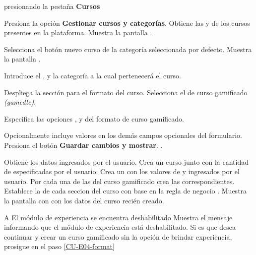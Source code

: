 \begin{UCtrayectoria}%
   presionando la pestaña {\bf Cursos}

  \Actor Presiona la opción {\bf Gestionar cursos y categorías}.
  \Sistema Obtiene las  y
            de los cursos presentes en la plataforma.
  \Sistema Muestra la pantalla .

  \Actor Selecciona el botón nuevo curso de la categoría seleccionada por defecto.
  \Sistema Muestra la pantalla .

  \Actor Introduce el ,  y
         la categoría a la cual pertenecerá el curso.

  \Actor Despliega la sección para el formato del curso.
  \Actor Selecciona el  de curso gamificado {\it(gamedle)}.
          \label{CU-E04-format}

  \Actor Especifica las opciones ,
          y  
         del formato de curso gamificado.  

  \Actor Opcionalmente incluye valores en los demás campos opcionales del formulario.
  \Actor Presiona el botón {\bf Guardar cambios y mostrar}.  
          \label{CU-E04-submit}.

  \Sistema Obtiene los datos ingresados por el usuario.
  \Sistema Crea un curso  junto con la cantidad de
            especificadas por el usuario.
  \Sistema Crea un  con los valores de  
           y  ingresados por el usuario.
  \Sistema Por cada una de las  del curso gamificado
           crea las  correspondientes.
  \Sistema Establece la  de cada seccion del curso con base
           en la regla de negocio . \label{CU-E04-finish}
  \Sistema Muestra la pantalla con  con los datos del curso recién
           creado.

\end{UCtrayectoria}

\begin{UCtrayectoriaA}{A}{%
El módulo de experiencia se encuentra deshabilitado
}
  \Sistema Muestra el mensaje informando que el módulo de experiencia está
           deshabilitado.
  \Actor Si es que desea continuar y crear un curso gamificado sin la opción
         de brindar experiencia, prosigue en el paso \ref{CU-E04-format}

\end{UCtrayectoriaA}

